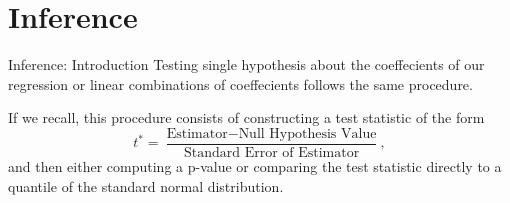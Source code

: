 \documentclass[notheorems,9pt, handout]{beamer}
\begin{document}

\section{Inference}
\begin{frame}{Inference: Introduction} 
	\label{frame:inference-intro}
	Testing single hypothesis about the coeffecients of our regression or linear combinations of coeffecients follows the same procedure.

	If we recall, this procedure consists of constructing a test statistic of the form 
	\[
		t^* = \frac{\text{Estimator} - \text{Null Hypothesis Value}}{\text{Standard Error of Estimator}} 
	,\] 
	and then either computing a p-value or comparing the test statistic directly to a quantile of the standard normal distribution.
\end{frame}
\end{document}
